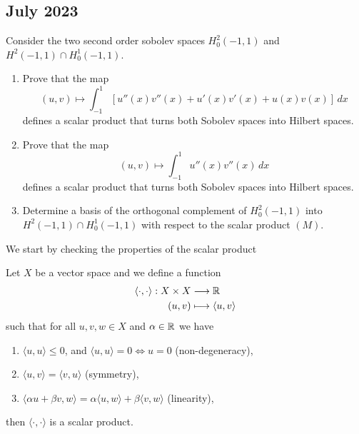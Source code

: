 \subsection{July 2023}
\begin{exercise}
    Consider the two second order sobolev spaces \(H^2_0(-1, 1)\) and \(H^2(-1, 1) \cap H^1_0(-1, 1)\).
    \begin{enumerate}
        \item Prove that the map
              \[
                  (u, v) \longmapsto \int_{-1}^1 \left[ u''(x) v''(x) + u'(x) v'(x) + u(x) v(x) \right] \, dx
              \]
              defines a scalar product that turns both Sobolev spaces into Hilbert spaces.
        \item Prove that the map
              \[
                  (u, v) \longmapsto \int_{-1}^1 u''(x) v''(x) \, dx
                  \tag{(M)}
              \]
              defines a scalar product that turns both Sobolev spaces into Hilbert spaces.
        \item Determine a basis of the orthogonal complement of \(H^2_0(-1, 1)\) into
              \(H^2(-1, 1)\cap H^1_0(-1, 1)\) with respect to the scalar product \((M)\).
    \end{enumerate}
\end{exercise}
We start by checking the properties of the scalar product
\begin{remark}
    Let \(X\) be a vector space and we define a function
    \[
        \begin{aligned}
            \langle \cdot, \cdot \rangle : X \times X & \longrightarrow \mathbb{R}            \\
            (u, v)                                    & \longmapsto \langle u, v \rangle
        \end{aligned}
    \]
    such that for all \(u, v, w \in X\) and \(\alpha \in \mathbb{R}\) we have
    \begin{enumerate}
        \item \(\langle u, u \rangle \leq 0\), and \(\langle u, u \rangle = 0 \iff u = 0\) (non-degeneracy),
        \item \(\langle u, v \rangle = \langle v, u \rangle\) (symmetry),
        \item \(\langle \alpha u + \beta v, w \rangle = \alpha \langle u, w \rangle + \beta \langle v, w \rangle\) (linearity),
    \end{enumerate}
    then \(\langle \cdot, \cdot \rangle\) is a scalar product.
\end{remark}
